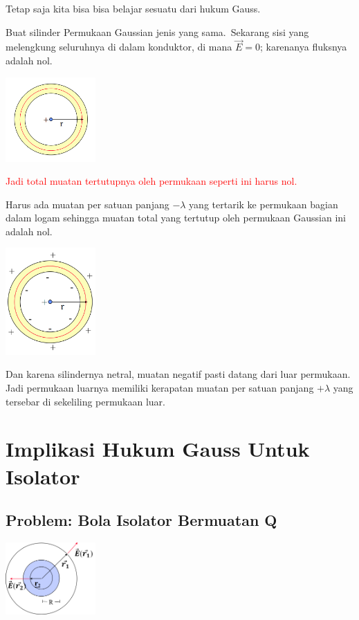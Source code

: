 \documentclass[twocolumn, 11pt]{article}%
\begin{document}
    Tetap saja kita bisa bisa belajar sesuatu dari hukum Gauss.

    Buat silinder Permukaan Gaussian jenis yang sama. Sekarang sisi yang melengkung seluruhnya di dalam konduktor, di mana $\vec E=0$; karenanya fluksnya adalah nol.

    \begin{center}
        \includegraphics[width=130px]{24.png}
    \end{center}

    \textcolor{red}{Jadi total muatan tertutupnya oleh permukaan seperti ini harus nol.}

    Harus ada muatan per satuan panjang $-\lambda$ yang tertarik ke permukaan bagian dalam logam sehingga muatan total yang tertutup oleh permukaan Gaussian ini adalah nol.

    \begin{center}
        \includegraphics[width=130px]{25.png}
    \end{center}

    Dan karena silindernya netral, muatan negatif pasti datang dari luar permukaan. Jadi permukaan luarnya memiliki kerapatan muatan per satuan panjang $+\lambda$ yang tersebar di sekeliling permukaan luar.

\section{Implikasi Hukum Gauss Untuk Isolator}%
    \subsection{Problem: Bola Isolator Bermuatan Q}%

    \begin{center}
        \includegraphics[width=130px]{26.png}
    \end{center}
\end{document}
